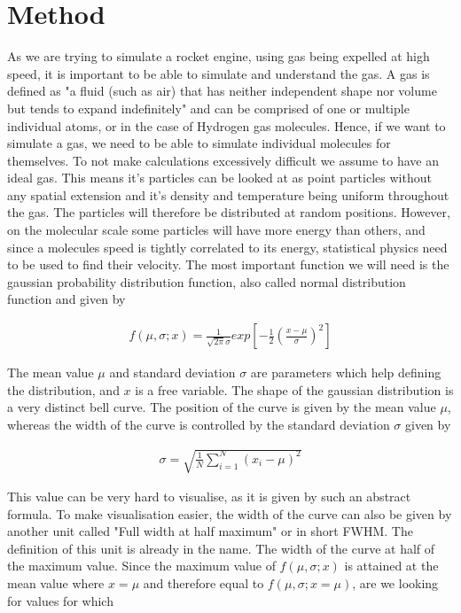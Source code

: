 \documentclass[reprint,english,notitlepage]{revtex4-2}
\begin{document}
\section{Method}
As we are trying to simulate a rocket engine, using gas being expelled at high speed, it is important to be able to simulate and understand the gas.
A gas is defined as "a fluid (such as air) that has neither independent shape nor volume but tends to expand indefinitely"
and can be comprised of one or multiple individual atoms, or in the case of Hydrogen gas molecules.
Hence, if we want to simulate a gas, we need to be able to simulate individual molecules for themselves.
To not make calculations excessively difficult we assume to have an ideal gas.
This means it's particles can be looked at as point particles without any spatial extension and it's density and temperature being uniform throughout the gas.
The particles will therefore be distributed at random positions.
However, on the molecular scale some particles will have more energy than others, and since a molecules speed is tightly correlated to its energy, statistical physics need to be used to find their velocity.
The most important function we will need is the gaussian probability distribution function, also called normal distribution function and given by

\begin{align}
    f(\mu, \sigma; x) = \frac{1}{\sqrt{2\pi}\sigma} exp \left[-\frac{1}{2}\left(\frac{x-\mu}{\sigma}\right)^2 \right] \label{Normal_Distribution}
\end{align}

The mean value $\mu$ and standard deviation $\sigma$ are parameters which help defining the distribution, and $x$ is a free variable.
The shape of the gaussian distribution is a very distinct bell curve. The position of the curve is given by the mean value $\mu$, whereas the width of the curve is controlled by the standard deviation $\sigma$ given by

\begin{align*}
    \sigma = \sqrt{\frac{1}{N}\sum_{i = 1}^{N} \left(x_i-\mu \right)^2}
\end{align*}

This value can be very hard to visualise, as it is given by such an abstract formula.
To make visualisation easier, the width of the curve can also be given by another unit called "Full width at half maximum" or in short FWHM.
The definition of this unit is already in the name. The width of the curve at half of the maximum value.
Since the maximum value of $f(\mu, \sigma; x)$ is attained at the mean value where $x=\mu$ and therefore equal to $f(\mu, \sigma; x=\mu)$, are we looking for values for which
\end{document}
